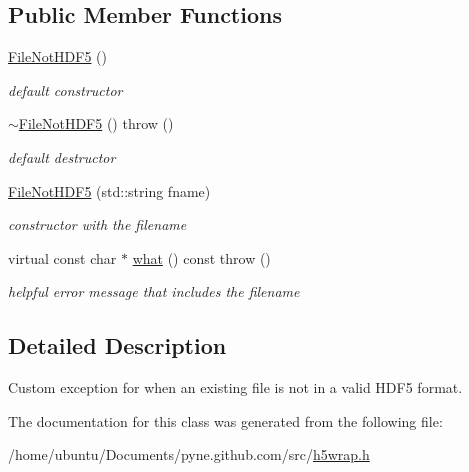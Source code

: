 \subsection*{Public Member Functions}
\begin{DoxyCompactItemize}
\item 
\hyperlink{classh5wrap_1_1_file_not_h_d_f5_a3fa40cb39abaa241e80ee97a13e69815}{File\+Not\+H\+D\+F5} ()\hypertarget{classh5wrap_1_1_file_not_h_d_f5_a3fa40cb39abaa241e80ee97a13e69815}{}\label{classh5wrap_1_1_file_not_h_d_f5_a3fa40cb39abaa241e80ee97a13e69815}

\begin{DoxyCompactList}\small\item\em default constructor \end{DoxyCompactList}\item 
\hyperlink{classh5wrap_1_1_file_not_h_d_f5_a55276b2bc97da82f25a0718327b00742}{$\sim$\+File\+Not\+H\+D\+F5} ()  throw ()\hypertarget{classh5wrap_1_1_file_not_h_d_f5_a55276b2bc97da82f25a0718327b00742}{}\label{classh5wrap_1_1_file_not_h_d_f5_a55276b2bc97da82f25a0718327b00742}

\begin{DoxyCompactList}\small\item\em default destructor \end{DoxyCompactList}\item 
\hyperlink{classh5wrap_1_1_file_not_h_d_f5_ac6f9e6588f3a55f26fe6cd13ab75425b}{File\+Not\+H\+D\+F5} (std\+::string fname)\hypertarget{classh5wrap_1_1_file_not_h_d_f5_ac6f9e6588f3a55f26fe6cd13ab75425b}{}\label{classh5wrap_1_1_file_not_h_d_f5_ac6f9e6588f3a55f26fe6cd13ab75425b}

\begin{DoxyCompactList}\small\item\em constructor with the filename \end{DoxyCompactList}\item 
virtual const char $\ast$ \hyperlink{classh5wrap_1_1_file_not_h_d_f5_afce2273e3c8d54802598bdc30cdedec2}{what} () const   throw ()\hypertarget{classh5wrap_1_1_file_not_h_d_f5_afce2273e3c8d54802598bdc30cdedec2}{}\label{classh5wrap_1_1_file_not_h_d_f5_afce2273e3c8d54802598bdc30cdedec2}

\begin{DoxyCompactList}\small\item\em helpful error message that includes the filename \end{DoxyCompactList}\end{DoxyCompactItemize}


\subsection{Detailed Description}
Custom exception for when an existing file is not in a valid H\+D\+F5 format. 

The documentation for this class was generated from the following file\+:\begin{DoxyCompactItemize}
\item 
/home/ubuntu/\+Documents/pyne.\+github.\+com/src/\hyperlink{h5wrap_8h}{h5wrap.\+h}\end{DoxyCompactItemize}
